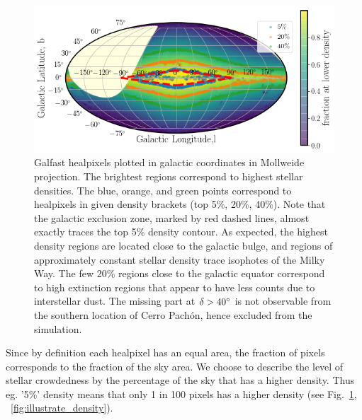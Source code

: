 \documentclass[DM,lsstdraft,toc,usenatbib]{lsstdoc}
\begin{document}
\begin{figure}
\includegraphics[width=1.0\columnwidth]{figs/MAF_densities.png}
\caption{Galfast healpixels plotted in galactic coordinates in Mollweide projection. The brightest regions correspond to highest stellar densities. The blue, orange, and green points correspond to healpixels in given density brackets (top 5\%, 20\%, 40\%). Note that the galactic exclusion zone, marked by red dashed lines, almost exactly traces the top 5\% density contour. As expected, the highest density regions are located close to the galactic bulge, and regions of approximately constant stellar density trace isophotes of the Milky Way. The few 20\% regions close to the galactic equator correspond to high extinction regions that appear to have less counts due to interstellar dust. The missing part at  $\delta>40 \degree$  is not observable from the southern location of Cerro Pach\'on, hence excluded from the simulation.  }
\label{fig:MAF_densities}
\end{figure} 

Since by definition each healpixel has an equal area, the fraction of pixels  corresponds to the fraction of the sky area. We choose to describe the level of stellar crowdedness by the percentage of the sky that has a higher density. Thus eg.  '5\%' density means that only 1 in 100 pixels has a higher density (see Fig.~\ref{fig:MAF_densities}, ~\ref{fig:illustrate_density}). 
\end{document}
